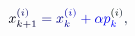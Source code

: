 \documentclass[12pt]{article}
\begin{document}
\makeatletter
\renewcommand*{\@textcolor}[3]{%
  \protect\leavevmode
  \begingroup
    \color#1{#2}#3%
  \endgroup
}
\makeatother
\begin{displaymath}
\mathcolor[RGB]{0,0,15}{x} _ { \mathcolor[RGB]{0,0,30}{k} \mathcolor[RGB]{0,0,45}{+} \mathcolor[RGB]{0,0,60}{1} } ^ { \mathcolor[RGB]{0,0,75}{(} \mathcolor[RGB]{0,0,90}{i} \mathcolor[RGB]{0,0,105}{)} } \mathcolor[RGB]{0,0,120}{=} \mathcolor[RGB]{0,0,135}{x} _ { \mathcolor[RGB]{0,0,150}{k} } ^ { \mathcolor[RGB]{0,0,165}{(} \mathcolor[RGB]{0,0,180}{i} \mathcolor[RGB]{0,0,195}{)} } \mathcolor[RGB]{0,0,210}{+} \mathcolor[RGB]{0,0,225}{\alpha} \mathcolor[RGB]{0,0,240}{p} _ { \mathcolor[RGB]{0,0,255}{k} } ^ { \mathcolor[RGB]{0,15,0}{(} \mathcolor[RGB]{0,15,15}{i} \mathcolor[RGB]{0,15,30}{)} } \mathcolor[RGB]{0,15,45}{,}
\end{displaymath}
\end{document}

